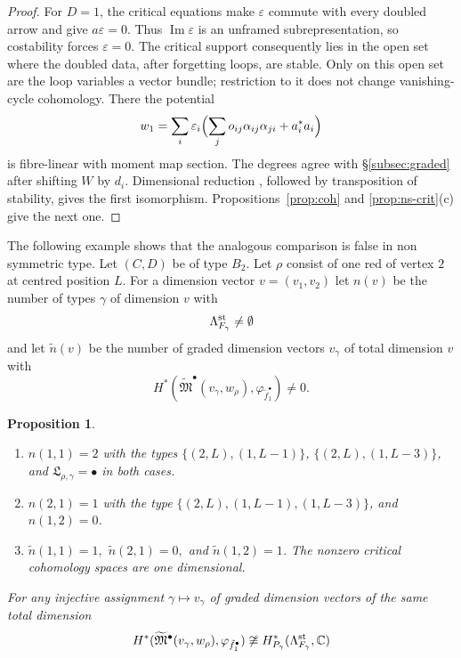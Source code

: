 \documentclass[11pt,reqno]{amsart}
\newtheorem{Proposition}[Theorem]{Proposition}
\theoremstyle{definition}
\theoremstyle{remark}
\def\bbC{\mathbb C}
\begin{document}
\begin{proof}
For $D=1$, the critical equations make $\varepsilon$ commute
with every doubled arrow and give $a\varepsilon=0$.
Thus $\operatorname{Im}\varepsilon$ is an unframed subrepresentation,
so costability forces $\varepsilon=0$.
The critical support consequently lies in the open set where the
doubled data, after forgetting loops, are stable. Only on this open
set are the loop variables a vector bundle; restriction to it
does not change vanishing-cycle cohomology.
There the potential
\[
 w_1=\sum_i\varepsilon_i\Bigl(\sum_j o_{ij}\alpha_{ij}\alpha_{ji}
                  +a_i^*a_i\Bigr)
\]
is fibre-linear with moment map section. The degrees agree with
\S\ref{subsec:graded} after shifting $W$ by $d_i$.
Dimensional reduction \cite[Prop.~4.6]{VV23}, followed by
transposition of stability, gives the first isomorphism.
Propositions~\ref{prop:coh} and \ref{prop:ns-crit}(c) give the next one.
\end{proof}

The following example shows that the analogous comparison is false in non symmetric type.
Let $(C,D)$ be of type $B_2$. Let $\rho$ consist of one red of vertex $2$ at centred position $L$. 
For a dimension vector $v=(v_1,v_2)$ let $n(v)$ be the number of types $\gamma$ of 
dimension $v$ with $$\Lambda^{\rm st}_{F_\gamma}\neq\emptyset$$ and let
$\tilde n(v)$ be the number of graded dimension vectors $v_\gamma$ of total
dimension $v$ with $$H^*(\widetilde{\mathfrak M}^\bullet(v_\gamma,w_\rho),\varphi_{\tilde f^\bullet_1})\neq0.$$

\begin{Proposition}\label{prop:VV23-fails} \hfill
\begin{enumerate}[label=$\mathrm{(\alph*)}$,leftmargin=8mm]
\item $n(1,1)=2$ with the  types $\{(2,L),(1,L-1)\}$, $\{(2,L),(1,L-3)\}$, and $\mathfrak L_{\rho,\gamma}=\bullet$ in both cases.
\item $n(2,1)=1$ with the type $\{(2,L),(1,L-1),(1,L-3)\}$, and $n(1,2)=0$.
\item $\tilde n(1,1)=1,$ $\tilde n(2,1)=0,$ and $\tilde n(1,2)=1$.
The nonzero critical cohomology spaces are one dimensional. 
\end{enumerate}
For any injective
assignment $\gamma\mapsto v_\gamma$ of graded dimension vectors of the same total dimension
$$H^*(\widetilde{\mathfrak M}^\bullet(v_\gamma,w_\rho),\varphi_{\tilde f^\bullet_1})
\not\cong
H^*_{P_\gamma}(\Lambda^{\rm st}_{F_\gamma},\bbC)$$
\end{Proposition}
\end{document}
